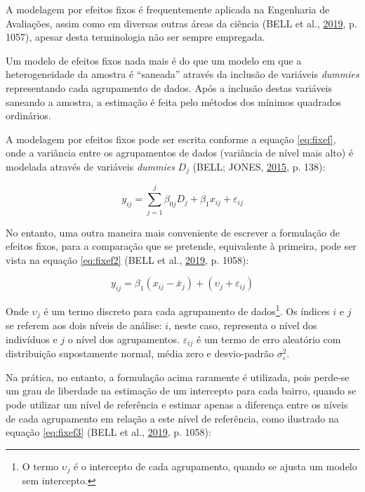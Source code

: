 \documentclass[
  a4paper, 11pt]{article}
\begin{document}
A modelagem por efeitos fixos é frequentemente aplicada na Engenharia de
Avaliações, assim como em diversas outras áreas da ciência (BELL et al.,
\protect\hyperlink{ref-bell2019}{2019}, p. 1057), apesar desta
terminologia não ser sempre empregada.

Um modelo de efeitos fixos nada mais é do que um modelo em que a
heterogeneidade da amostra é ``saneada'' através da inclusão de
variáveis \emph{dummies} representando cada agrupamento de dados. Após a
inclusão destas variáveis saneando a amostra, a estimação é feita pelo
métodos dos mínimos quadrados ordinários.

A modelagem por efeitos fixos pode ser escrita conforme a equação
\ref{eq:fixef}, onde a variância entre os agrupamentos de dados
(variância de nível mais alto) é modelada através de variáveis
\emph{dummies} \(D_j\) (BELL; JONES,
\protect\hyperlink{ref-bell2015}{2015}, p. 138):

\begin{equation} \label{eq:fixef}
y_{ij} = \sum_{j=1}^{j}\beta_{0j}D_j + \beta_1 x_{ij} + \varepsilon_{ij}
\end{equation}

No entanto, uma outra maneira mais conveniente de escrever a formulação
de efeitos fixos, para a comparação que se pretende, equivalente à
primeira, pode ser vista na equação \ref{eq:fixef2} (BELL et al.,
\protect\hyperlink{ref-bell2019}{2019}, p. 1058):

\begin{equation} \label{eq:fixef2}
y_{ij} = \beta_1 (x_{ij} - \bar{x}_j) + (\upsilon_j + \varepsilon_{ij}) 
\end{equation}

Onde \(\upsilon_j\) é um termo discreto para cada agrupamento de
dados\footnote{O termo \(\upsilon_j\) é o intercepto de cada
  agrupamento, quando se ajusta um modelo sem intercepto.}. Os índices
\(i\) e \(j\) se referem aos dois níveis de análise: \(i\), neste caso,
representa o nível dos indivíduos e \(j\) o nível dos agrupamentos.
\(\varepsilon_{ij}\) é um termo de erro aleatório com distribuição
supostamente normal, média zero e desvio-padrão
\(\sigma_{\varepsilon}^2\).

Na prática, no entanto, a formulação acima raramente é utilizada, pois
perde-se um grau de liberdade na estimação de um intercepto para cada
bairro, quando se pode utilizar um nível de referência e estimar apenas
a diferença entre os níveis de cada agrupamento em relação a este nível
de referência, como ilustrado na equação \ref{eq:fixef3} (BELL et al.,
\protect\hyperlink{ref-bell2019}{2019}, p. 1058):
\end{document}
